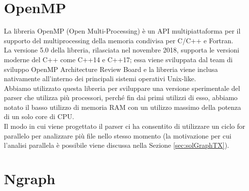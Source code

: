 \section{OpenMP} \label{sec:openmp}

La libreria OpenMP (Open Multi-Processing) \cite{dagum1998openmp} è un API multipiattaforma per il supporto del multiprocessing della memoria condivisa per C/C++ e Fortran.\\
La versione 5.0 della libreria, rilasciata nel novembre 2018, supporta le versioni moderne del C++ come C++14 e C++17; essa viene sviluppata dal team di sviluppo OpenMP Architecture Review Board e la libreria viene inclusa nativamente all'interno dei principali sistemi operativi Unix-like.\\
Abbiamo utilizzato questa libreria per sviluppare una versione sperimentale del parser che utilizza più processori, perché fin dai primi utilizzi di esso, abbiamo notato il basso utilizzo di memoria RAM con un utilizzo massimo della potenza di un solo core di CPU.\\
Il modo in cui viene progettato il parser ci ha consentito di utilizzare un ciclo for parallelo per analizzare più file nello stesso momento (la motivazione per cui l'analisi parallela è possibile viene discussa nella Sezione \ref{sec:solGraphTX}).

\section{Ngraph} \label{sec:ngraph}


